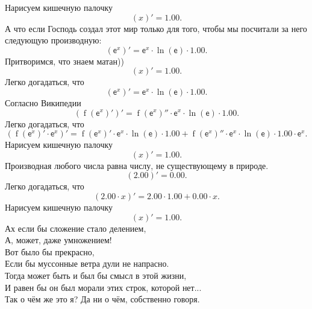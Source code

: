 \documentclass[a4paper,oneside,final,12pt,russian]{extarticle}
\newcommand{\e}{\mathsf{e}}
\begin{document}
Нарисуем кишечную палочку
\begin{dmath*}
(x )' = 1.00 .
\end{dmath*}
А что если Господь создал этот мир только для того, 
чтобы мы посчитали за него следующую производную:
\begin{dmath*}
(\e ^{x } )' = \e ^{x } \cdot \operatorname{ln}(\e ) \cdot 1.00 .
\end{dmath*}
Притворимся, что знаем матан))
\begin{dmath*}
(x )' = 1.00 .
\end{dmath*}
Легко догадаться, что
\begin{dmath*}
(\e ^{x } )' = \e ^{x } \cdot \operatorname{ln}(\e ) \cdot 1.00 .
\end{dmath*}
Согласно Википедии
\begin{dmath*}
(\operatorname{f}(\e ^{x } ) ')' = \operatorname{f}(\e ^{x } ) ''\cdot \e ^{x } \cdot \operatorname{ln}(\e ) \cdot 1.00 .
\end{dmath*}
Легко догадаться, что
\begin{dmath*}
(\operatorname{f}(\e ^{x } ) '\cdot \e ^{x } )' = \operatorname{f}(\e ^{x } ) '\cdot \e ^{x } \cdot \operatorname{ln}(\e ) \cdot 1.00 + \operatorname{f}(\e ^{x } ) ''\cdot \e ^{x } \cdot \operatorname{ln}(\e ) \cdot 1.00 \cdot \e ^{x } .
\end{dmath*}
Нарисуем кишечную палочку
\begin{dmath*}
(x )' = 1.00 .
\end{dmath*}
Производная любого числа равна числу, не существующему в природе.
\begin{dmath*}
(2.00 )' = 0.00 .
\end{dmath*}
Легко догадаться, что
\begin{dmath*}
(2.00 \cdot x )' = 2.00 \cdot 1.00 + 0.00 \cdot x .
\end{dmath*}
Нарисуем кишечную палочку
\begin{dmath*}
(x )' = 1.00 .
\end{dmath*}
Ах если бы сложение стало делением, \\ 
А, может, даже умножением! \\ 
Вот было бы прекрасно,\\ 
Если бы муссонные ветра дули не напрасно. \\ 
Тогда может быть и был бы смысл в этой жизни,\\ 
И равен бы он был морали этих строк, которой нет...\\ 
Так о чём же это я? Да ни о чём, собственно говоря.
\end{document}
